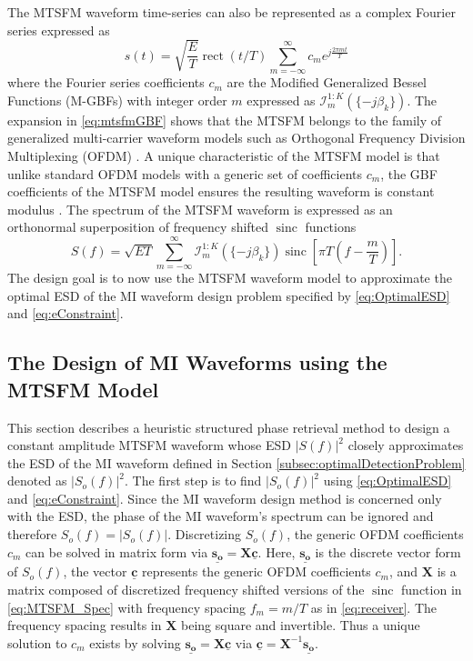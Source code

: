 \documentclass{article}
\DeclareMathOperator{\sinc}{sinc}
\DeclareMathOperator{\rect}{rect}
\begin{document}
The MTSFM waveform time-series can also be represented as a complex Fourier series expressed as \cite{Hague_MTSFM}
\begin{equation}
s\left(t\right) = \sqrt{\frac{E}{T}}\rect\left(t/T\right)\sum_{m=-\infty}^{\infty} c_m e^{j\frac{2\pi m t}{T}}
\label{eq:mtsfmGBF}
\end{equation}
where the Fourier series coefficients $c_m$ are the Modified Generalized Bessel Functions (M-GBFs) \cite{DattoliBook} with integer order $m$ expressed as $\mathcal{I}_m^{1:K}\left(\{-j\beta_k\}\right)$.  The expansion in \eqref{eq:mtsfmGBF} shows that the MTSFM belongs to the family of generalized multi-carrier waveform models such as Orthogonal Frequency Division Multiplexing (OFDM) \cite{Koivunen}.  A unique characteristic of the MTSFM model is that unlike standard OFDM models with a generic set of coefficients $c_m$, the GBF coefficients of the MTSFM model ensures the resulting waveform is constant modulus \cite{Hague_MTSFM, HagueASA}.  The spectrum of the MTSFM waveform is expressed as an orthonormal superposition of frequency shifted $\sinc$ functions \cite{Hague_MTSFM}
\begin{equation}
S\left(f\right) = \sqrt{ET} \sum_{m=-\infty}^{\infty}\mathcal{I}_m^{1:K}\left(\{-j\beta_k\}\right) \sinc\left[\pi T \left(f-\frac{m}{T}\right)\right].
\label{eq:MTSFM_Spec}
\end{equation}
The design goal is to now use the MTSFM waveform model to approximate the optimal ESD of the MI waveform design problem specified by \eqref{eq:OptimalESD} and \eqref{eq:eConstraint}.

\subsection{The Design of MI Waveforms using the MTSFM Model}
\label{subsec:MI_MTSFM}
This section describes a heuristic structured phase retrieval method to design a constant amplitude MTSFM waveform whose ESD $|S\left(f\right)|^2$ closely approximates the ESD of the MI waveform defined in Section \ref{subsec:optimalDetectionProblem} denoted as $|S_o\left(f\right)|^2$.  The first step is to find $|S_o\left(f\right)|^2$ using \eqref{eq:OptimalESD} and \eqref{eq:eConstraint}.  Since the MI waveform design method is concerned only with the ESD, the phase of the MI waveform's spectrum can be ignored and therefore $S_o\left(f\right) = |S_o\left(f\right)|$.  Discretizing $S_o\left(f\right)$, the generic OFDM coefficients $c_m$ can be solved in matrix form via $\underline{\mathbf{s_o}}=\mathbf{X}\mathbf{\underline{c}}$.  Here, $\underline{\mathbf{s_o}}$ is the discrete vector form of $S_o\left(f\right)$, the vector $\underline{\mathbf{c}}$ represents the generic OFDM coefficients $c_m$, and $\mathbf{X}$ is a matrix composed of discretized frequency shifted versions of the $\sinc$ function in \eqref{eq:MTSFM_Spec} with frequency spacing $f_m = m/T$ as in \eqref{eq:receiver}.  The frequency spacing results in $\mathbf{X}$ being square and invertible.  Thus a unique solution to $c_m$ exists by solving $\underline{\mathbf{s_o}}=\mathbf{X}\mathbf{\underline{c}}$ via $\underline{\mathbf{c}}=\mathbf{X}^{-1}\underline{\mathbf{s_o}}$.
\end{document}
